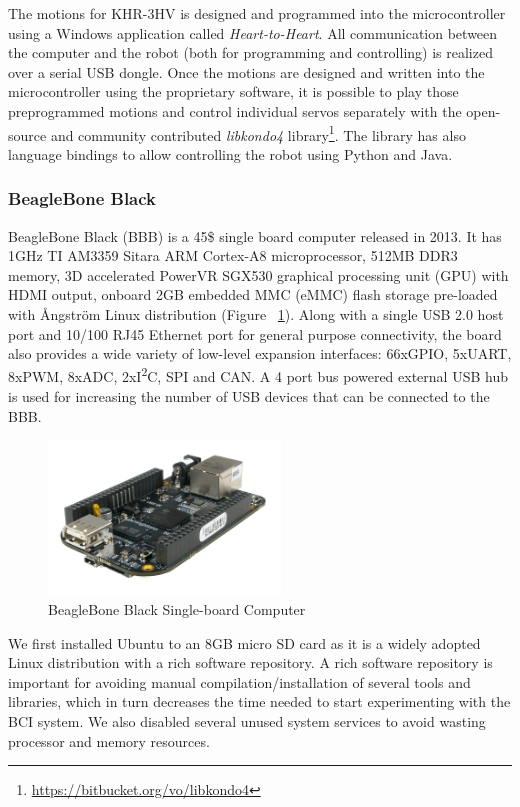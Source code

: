 \documentclass[12pt]{article}
\newcommand\mysubsubsection[1]{\subsubsection{#1}}
\numberwithin{equation}{section}
\numberwithin{figure}{section}
\numberwithin{table}{section}
\begin{document}
\par{
    The motions for KHR-3HV is designed and programmed into the microcontroller
    using a Windows application called \emph{Heart-to-Heart}. All communication
    between the computer and the robot (both for programming and controlling)
    is realized over a serial USB dongle. Once the motions are designed and written
    into the microcontroller using the proprietary software,
    it is possible to play those preprogrammed motions and
    control individual servos separately with the open-source and community
    contributed \emph{libkondo4} library\footnote{\url{https://bitbucket.org/vo/libkondo4}}.
    The library has also language bindings to allow controlling the robot using Python and Java.
}

\mysubsubsection{BeagleBone Black}

\par{
    BeagleBone Black (BBB) is a 45\$ single board computer released in 2013. It has 1GHz TI AM3359 Sitara ARM Cortex-A8 microprocessor,
    512MB DDR3 memory, 3D accelerated PowerVR SGX530 graphical processing unit (GPU) with HDMI output, onboard 2GB embedded MMC (eMMC)
    flash storage pre-loaded with Ångström Linux distribution (Figure ~\ref{fig:bbb}). Along with a single USB 2.0 host port and 10/100 RJ45 Ethernet port for
    general purpose connectivity, the board also provides a wide variety of low-level expansion interfaces:
    66xGPIO, 5xUART, 8xPWM, 8xADC, 2xI\textsuperscript{2}C, SPI and CAN. A 4 port bus powered external USB hub is used for
    increasing the number of USB devices that can be connected to the BBB.
}

\begin{figure}[ht]
    \centering
    \includegraphics[width=0.55\textwidth]{images/bbb}
    \caption{BeagleBone Black Single-board Computer}
    \label{fig:bbb}
\end{figure}

\par{
    We first installed Ubuntu to an 8GB micro SD card as it is a widely adopted Linux distribution with a rich software repository.
    A rich software repository is important for avoiding manual compilation/installation of several tools and libraries,
    which in turn decreases the time needed to start experimenting with the BCI system. We also disabled
    several unused system services to avoid wasting processor and memory resources.
}
\end{document}
